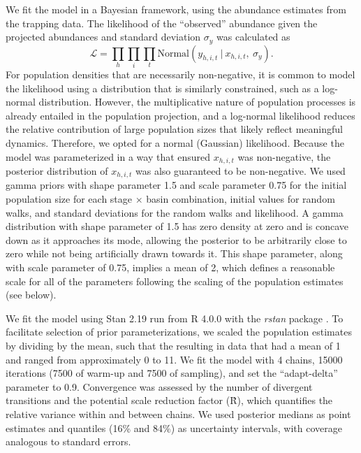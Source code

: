 We fit the model in a Bayesian framework,
using the abundance estimates from the trapping data.
The likelihood of the ``observed'' abundance given the projected abundances
and standard deviation $\sigma_y$ was calculated as
%
\begin{equation} \label{eq:likelihood}
\mathcal{L} =
\displaystyle\prod_{h}
\displaystyle\prod_{i}
\displaystyle\prod_{t}
\text{Normal}
    \left(
        y_{h,i,t}~|~x_{h,i,t},~\sigma_y
    \right).
\end{equation}
%
For population densities that are necessarily non-negative,
it is common to model the likelihood using a distribution that is similarly constrained,
such as a log-normal distribution.
However, the multiplicative nature of population processes is already entailed
in the population projection,
and a log-normal likelihood reduces the relative contribution of large population sizes
that likely reflect meaningful dynamics.
Therefore, we opted for a normal (Gaussian) likelihood.
Because the model was parameterized in a way that ensured
$x_{h,i,t}$ was non-negative,
the posterior distribution of $x_{h,i,t}$ was also guaranteed to be non-negative.
We used gamma priors with shape parameter 1.5 and scale parameter 0.75
for the initial population size for each stage $\times$ basin combination,
initial values for random walks,
and standard deviations for the random walks and likelihood.
A gamma distribution with shape parameter of 1.5 has zero density at zero
and is concave down as it approaches its mode,
allowing the posterior to be arbitrarily close to zero
while not being artificially drawn towards it.
This shape parameter, along with scale parameter of 0.75,
implies a mean of 2,
which defines a reasonable scale for all of the parameters
following the scaling of the population estimates (see below).

We fit the model using Stan 2.19 \citep{Carpenter2017}
run from R 4.0.0 with the \emph{rstan} package \citep{Stan2018}.
To facilitate selection of prior parameterizations,
we scaled the population estimates by dividing by the mean,
such that the resulting in data that had a mean of 1
and ranged from approximately 0 to 11.
We fit the model with 4 chains,
15000 iterations (7500 of warm-up and 7500 of sampling),
and set the ``adapt-delta'' parameter to 0.9.
Convergence was assessed by the number of divergent transitions
and the potential scale reduction factor (\^{R}),
which quantifies the relative variance within and between chains.
We used posterior medians as point estimates
and quantiles (16\% and 84\%) as uncertainty intervals,
with coverage analogous to standard errors.

